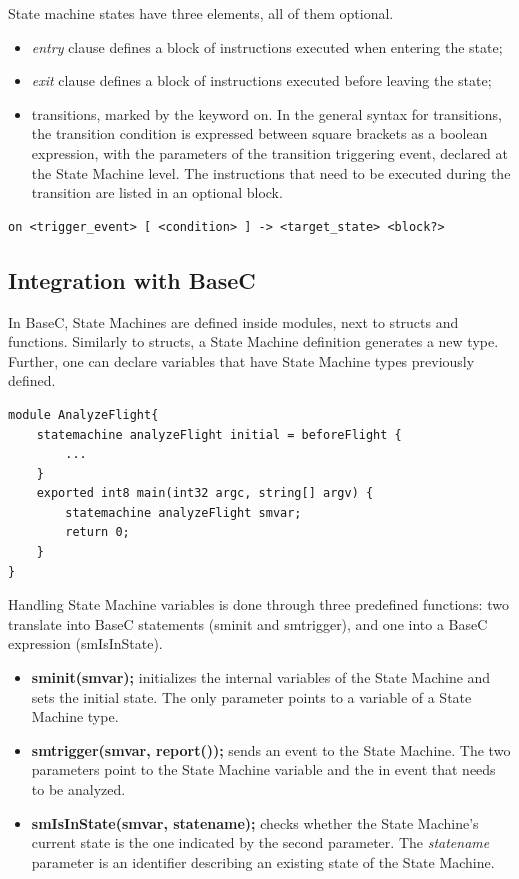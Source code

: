 \documentclass[a4paper,10pt,titlepage]{report}
\begin{document}
{\setlength{\parindent}{0cm}
State machine states have three elements, all of them optional.
}
\begin{itemize}
\item \emph{entry} clause defines a block of instructions executed when entering the state;
\item \emph{exit} clause defines a block of instructions executed before leaving the state;
\item transitions, marked by the keyword on. In the general syntax for transitions, the transition condition is expressed between square brackets as a boolean expression, with the parameters of the transition triggering event, declared at the State Machine level. The instructions that need to be executed during the transition are listed in an optional block.
\end{itemize}
 
\begin{lstlisting}
on <trigger_event> [ <condition> ] -> <target_state> <block?>
\end{lstlisting}

\subsection{Integration with BaseC}
In BaseC, State Machines are defined inside modules, next to structs and functions. Similarly to structs, a State Machine definition generates a new type. Further, one can declare variables that have State Machine types previously defined.

\begin{lstlisting}
module AnalyzeFlight{
    statemachine analyzeFlight initial = beforeFlight {
        ...
    }
    exported int8 main(int32 argc, string[] argv) {	  
        statemachine analyzeFlight smvar;
        return 0;
    }	
}
\end{lstlisting}

Handling State Machine variables is done through three predefined functions: two translate into BaseC statements (sminit and smtrigger), and one into a BaseC expression (smIsInState).

\begin{itemize}
\item \textbf{sminit(smvar);} initializes the internal variables of the State Machine and sets the initial state. The only parameter points to a variable of a State Machine type.

\item \textbf{smtrigger(smvar, report());} sends an event to the State Machine. The two parameters point to the State Machine variable and the in event that needs to be analyzed.

\item \textbf{smIsInState(smvar, statename);} checks whether the State Machine’s current state is the one indicated by the second parameter. The \emph{statename} parameter is an identifier describing an existing state of the State Machine.
\end{itemize}
\end{document}
